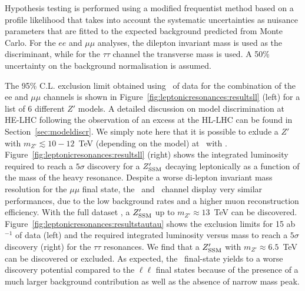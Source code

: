 Hypothesis testing is performed using a modified frequentist method based on a profile likelihood that takes into account the systematic uncertainties as nuisance parameters that are fitted to the expected background predicted from Monte Carlo. For the $ee$ and $\mu\mu$ analyses, the dilepton invariant mass is used as the discriminant, while for the $\tau\tau$ channel the transverse mass is used. A 50\% uncertainty on the background normalisation is assumed.

The 95\% C.L. exclusion limit obtained using \intlumihelhc\ of data for the combination of the ee and $\mu\mu$ channels is shown in Figure~\ref{fig:leptonicresonances:resultsll} (left) for a list of 6 different $Z'$ models. A detailed discussion on model discrimination at HE-LHC following the observation of an excess at the HL-LHC can be found in Section~\ref{sec:modeldiscr}. We simply note here that it is possible to exlude a $Z'$ with $m_{Z'}\lesssim 10-12$~TeV (depending on the model) at \sqrtshelhc\ with \intlumihelhc. Figure~\ref{fig:leptonicresonances:resultsll} (right) shows the integrated luminosity required to reach a $5\sigma$ discovery for a $Z^{\prime}_{\mathrm{SSM}}$ decaying leptonically as a function of the mass of the heavy resonance. Despite a worse di-lepton invariant mass resolution for the $\mu\mu$ final state, the \Zpee\ and \Zpmumu\ channel display very similar performances, due to the low background rates and a higher muon reconstruction efficiency. With the full dataset \intlumihelhc, a $Z^{\prime}_{\mathrm{SSM}}$ up to $m_{Z'}\approx 13$~TeV can be discovered.  Figure~\ref{fig:leptonicresonances:resultstautau} shows the exclusion limits for 15 ab$^{-1}$ of data (left) and the required integrated luminosity
versus mass to reach a $5\sigma$ discovery (right) for the $\tau\tau$ resonances. We find that a $Z^{\prime}_{\mathrm{SSM}}$ with $m_{Z'}\approx 6.5$~TeV can be discovered or excluded. As expected, the \Zptata\ final-state yields to a worse discovery potential compared to the $\ell\ell$ final states because of the presence of a much larger background contribution as well as the absence of narrow mass peak.

